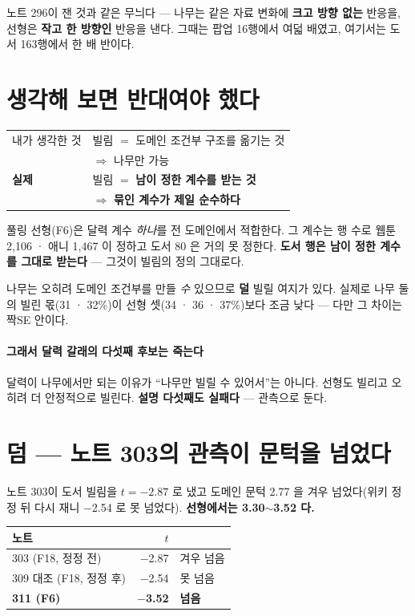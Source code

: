 \documentclass[10pt]{article}
\begin{document}
노트 296이 잰 것과 같은 무늬다 --- 나무는 같은 자료 변화에 \textbf{크고
방향 없는} 반응을, 선형은 \textbf{작고 한 방향인} 반응을 낸다. 그때는 팝업
16행에서 여덟 배였고, 여기서는 도서 163행에서 한 배 반이다.

\section{생각해 보면 반대여야 했다}

\begin{center}\small
\begin{tabular}{ll}
\hline
내가 생각한 것 & 빌림 ${=}$ 도메인 조건부 구조를 옮기는 것 \\
& $\Rightarrow$ 나무만 가능 \\
\hline
\textbf{실제} & 빌림 ${=}$ \textbf{남이 정한 계수를 받는 것} \\
& $\Rightarrow$ \textbf{묶인 계수가 제일 순수하다} \\
\hline
\end{tabular}
\end{center}

풀링 선형(F6)은 달력 계수 \emph{하나}를 전 도메인에서 적합한다. 그 계수는
행 수로 웹툰 2,106 · 애니 1,467 이 정하고 도서 80 은 거의 못 정한다.
\textbf{도서 행은 남이 정한 계수를 그대로 받는다} --- 그것이 빌림의 정의
그대로다.

나무는 오히려 도메인 조건부를 만들 \emph{수} 있으므로 \textbf{덜} 빌릴
여지가 있다. 실제로 나무 둘의 빌린 몫(31 · 32\%)이 선형 셋(34 · 36 · 37\%)보다
조금 낮다 --- 다만 그 차이는 짝SE 안이다.

\paragraph{그래서 달력 갈래의 다섯째 후보는 죽는다} 달력이 나무에서만 되는
이유가 ``나무만 빌릴 수 있어서''는 아니다. 선형도 빌리고 오히려 더 안정적으로
빌린다. \textbf{설명 다섯째도 실패다} --- 관측으로 둔다.

\section{덤 --- 노트 303의 관측이 문턱을 넘었다}

노트 303이 도서 빌림을 $t{=}{-}2.87$ 로 냈고 도메인 문턱 2.77 을 겨우
넘었다(위키 정정 뒤 다시 재니 $-$2.54 로 못 넘었다). \textbf{선형에서는
3.30$\sim$3.52 다.}

\begin{center}\footnotesize
\begin{tabular}{lrl}
\hline
노트 & $t$ & \\
\hline
303 (F18, 정정 전) & $-$2.87 & 겨우 넘음 \\
309 대조 (F18, 정정 후) & $-$2.54 & 못 넘음 \\
\textbf{311 (F6)} & \textbf{$-$3.52} & \textbf{넘음} \\
\hline
\end{tabular}
\end{center}
\end{document}
